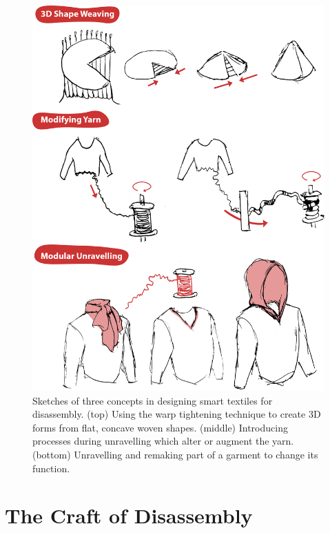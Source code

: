 \begin{figure}
    \centering
    \includegraphics[width=\linewidth]{figs/UF_concepts.png}
    \caption[Three concept sketches in designing smart textiles for disassembly.]{Sketches of three concepts in designing smart textiles for disassembly. (top) Using the warp tightening technique to create 3D forms from flat, concave woven shapes. (middle) Introducing processes during unravelling which alter or augment the yarn. (bottom) Unravelling and remaking part of a garment to change its function.}
    \label{fig:concepts}
\end{figure}

\section{The Craft of Disassembly}

